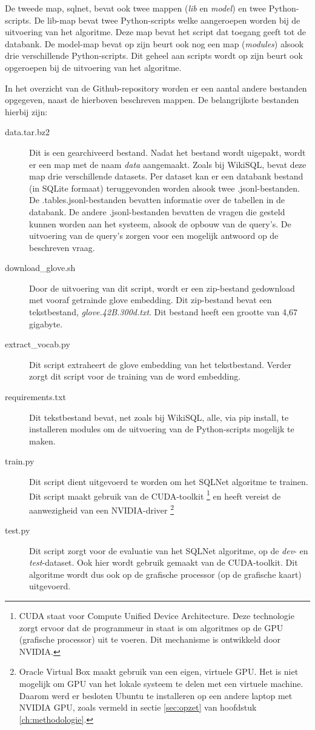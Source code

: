 De tweede map, sqlnet, bevat ook twee mappen (\textit{lib} en \textit{model}) en twee Python-scripts. De lib-map bevat twee Python-scripts welke aangeroepen worden bij de uitvoering van het algoritme. Deze map bevat het script dat toegang geeft tot de databank. De model-map bevat op zijn beurt ook nog een map (\textit{modules}) alsook drie verschillende Python-scripts. Dit geheel aan scripts wordt op zijn beurt ook opgeroepen bij de uitvoering van het algoritme. 

In het overzicht van de Github-repository worden er een aantal andere bestanden opgegeven, naast de hierboven beschreven mappen. De belangrijkste bestanden hierbij zijn:

\begin{description}
	\item[data.tar.bz2] Dit is een gearchiveerd bestand. Nadat het bestand wordt uigepakt, wordt er een map met de naam \textit{data} aangemaakt. Zoals bij WikiSQL, bevat deze map drie verschillende datasets. Per dataset kan er een databank bestand (in SQLite formaat) teruggevonden worden alsook twee .jsonl-bestanden. De .tables.jsonl-bestanden bevatten informatie over de tabellen in de databank. De andere .jsonl-bestanden bevatten de vragen die gesteld kunnen worden aan het systeem, alsook de opbouw van de query's. De uitvoering van de query's zorgen voor een mogelijk antwoord op de beschreven vraag.
	\item[download\_glove.sh] Door de uitvoering van dit script, wordt er een zip-bestand gedownload met vooraf getrainde glove embedding. Dit zip-bestand bevat een tekstbestand, \textit{glove.42B.300d.txt}. Dit bestand heeft een grootte van 4,67 gigabyte.
	\item[extract\_vocab.py] Dit script extraheert de glove embedding van het tekstbestand. Verder zorgt dit script voor de training van de word embedding. 
	\item[requirements.txt] Dit tekstbestand bevat, net zoals bij WikiSQL, alle, via pip install, te installeren modules om de uitvoering van de Python-scripts mogelijk te maken.
	\item[train.py] Dit script dient uitgevoerd te worden om het SQLNet algoritme te trainen. Dit script maakt gebruik van de CUDA-toolkit \footnote{CUDA staat voor Compute Unified Device Architecture. Deze technologie zorgt ervoor dat de programmeur in staat is om algoritmes op de GPU (grafische processor) uit te voeren. Dit mechanisme is ontwikkeld door NVIDIA.} en heeft vereist de aanwezigheid van een NVIDIA-driver \footnote{Oracle Virtual Box maakt gebruik van een eigen, virtuele GPU. Het is niet mogelijk om GPU van het lokale systeem te delen met een virtuele machine. Daarom werd er besloten Ubuntu te installeren op een andere laptop met NVIDIA GPU, zoals vermeld in sectie \ref{sec:opzet} van hoofdstuk \ref{ch:methodologie}.}
	\item[test.py] Dit script zorgt voor de evaluatie van het SQLNet algoritme, op de \textit{dev}- en \textit{test}-dataset. Ook hier wordt gebruik gemaakt van de CUDA-toolkit. Dit algoritme wordt dus ook op de grafische processor (op de grafische kaart) uitgevoerd.
\end{description}

